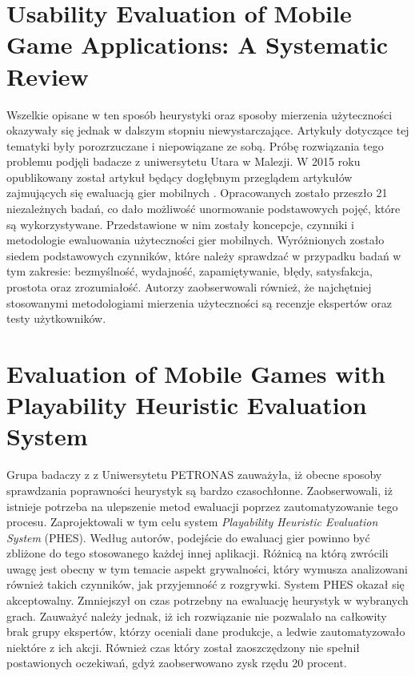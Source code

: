 \documentclass[a4paper,12pt,numbers=noenddot]{report}
\begin{document}
\section{Usability Evaluation of Mobile Game Applications: A Systematic Review}
Wszelkie opisane w ten sposób heurystyki oraz sposoby mierzenia użyteczności okazywały się jednak w dalszym stopniu niewystarczające. Artykuły dotyczące tej tematyki były porozrzuczane i niepowiązane ze sobą. Próbę rozwiązania tego problemu podjęli badacze z uniwersytetu Utara w Malezji. W 2015 roku opublikowany został artykuł będący dogłębnym przeglądem artykułów zajmujących się ewaluacją gier mobilnych \cite{art_UsabilityEvaluationSystematicReview}. Opracowanych zostało przeszło 21 niezależnych badań, co dało możliwość unormowanie podstawowych pojęć, które są wykorzystywane. Przedstawione w nim zostały koncepcje, czynniki i metodologie ewaluowania użyteczności gier mobilnych. Wyróżnionych zostało siedem podstawowych czynników, które należy sprawdzać w przypadku badań w tym zakresie: bezmyślność, wydajność, zapamiętywanie, błędy, satysfakcja, prostota oraz zrozumiałość. Autorzy zaobserwowali również, że najchętniej stosowanymi metodologiami mierzenia użyteczności są recenzje ekspertów oraz testy użytkowników.

\section{Evaluation of Mobile Games with Playability Heuristic Evaluation System}
Grupa badaczy z z Uniwersytetu PETRONAS zauważyła, iż obecne sposoby sprawdzania poprawności heurystyk są bardzo czasochłonne. \cite{art_evaluationOfMGevaluationSystem} Zaobserwowali, iż istnieje potrzeba na ulepszenie metod ewaluacji poprzez zautomatyzowanie tego procesu. Zaprojektowali w tym celu system \textit{Playability Heuristic Evaluation System} (PHES). Według autorów, podejście do ewaluacj gier powinno być zbliżone do tego stosowanego każdej innej aplikacji. Różnicą na którą zwrócili uwagę jest obecny w tym temacie aspekt grywalności, który wymusza analizowani również takich czynników, jak przyjemność z rozgrywki. System PHES okazał się akceptowalny. Zmniejszył on czas potrzebny na ewaluację heurystyk w wybranych grach. Zauważyć należy jednak, iż ich rozwiązanie nie pozwalało na całkowity brak grupy ekspertów, którzy oceniali dane produkcje, a ledwie zautomatyzowało niektóre z ich akcji. Również czas który został zaoszczędzony nie spełnił postawionych oczekiwań, gdyż zaobserwowano zysk rzędu 20 procent.
\end{document}
